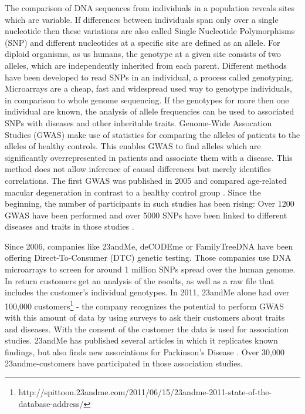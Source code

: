 \documentclass[10pt]{article}
\begin{document}
The comparison of DNA sequences from individuals in a population reveals sites which are variable. 
If differences between individuals span only over a single nucleotide then these variations are also called Single Nucleotide Polymorphisms (SNP) and different nucleotides 
at a specific site are defined as an allele. For diploid organisms, as us humans, the genotype at a given site consists of two alleles, which are independently inherited from each parent.
Different methods have been developed to read SNPs in an individual, a
process called genotyping. Microarrays are a cheap, fast and widespread used way to genotype individuals, in comparison
to whole genome sequencing. If the genotypes for more then one individual are known, the analysis of
allele frequencies can be used to associated SNPs with diseases and other inheritable traits. Genome-Wide Assocation Studies
(GWAS) make use of statistics for comparing the alleles of patients to the alleles of healthy controls. This
enables GWAS to find alleles which are significantly overrepresented in patients and associate them with a disease.
This method does not allow inference of causal differences but merely identifies correlations. 
The first GWAS was published in 2005 and compared age-related macular degeneration in contrast 
to a healthy control group \cite{Klein2005}. Since the beginning, the number of participants in 
such studies has been rising: Over 1200 GWAS have been performed \cite{Johnson2009} and over 
5000 SNPs have been linked to different diseases and traits in those studies \cite{Hindorff2009}. 


Since 2006, companies like 23andMe, deCODEme or FamilyTreeDNA have been offering Direct-To-Consumer (DTC) genetic testing. Those companies use DNA microarrays to screen for around 1 million SNPs spread over the human genome. In return customers get an analysis of the results, as well as a raw file that includes the customer's individual genotypes. In 2011, 23andMe alone had over 100,000 customers\footnote{http://spittoon.23andme.com/2011/06/15/23andme-2011-state-of-the-database-address/} - the company recognizes the potential to perform GWAS with this amount of data by using surveys to ask their customers about traits and diseases. With the consent of the customer the data is used for association studies. 23andMe has published several articles in which it replicates known findings, but also finds new associations for Parkinson's Disease \cite{Eriksson2010, Do2011}. Over 30,000 23andme-customers have participated in those association studies.  
\end{document}
